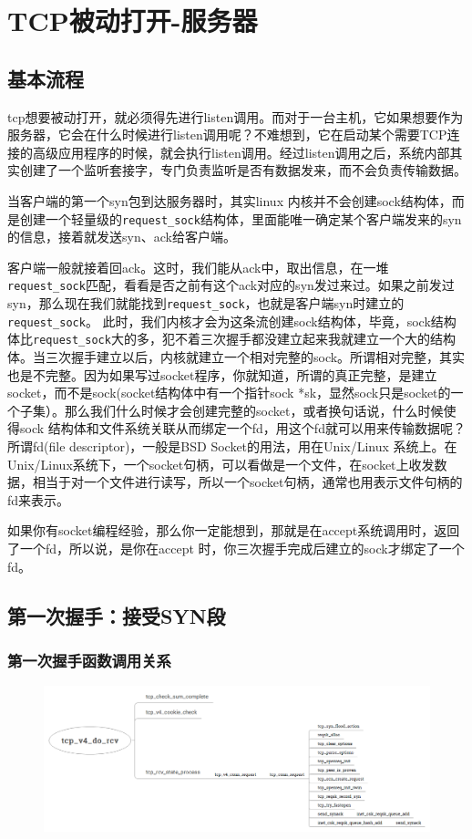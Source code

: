 \section{TCP被动打开-服务器}
        \subsection{基本流程}
            tcp想要被动打开，就必须得先进行listen调用。而对于一台主机，它如果想要作为服务器，它会在什么时候进行listen调用呢？不难想到，它在启动某个需要TCP连接的高级应用程序的时候，就会执行listen调用。经过listen调用之后，系统内部其实创建了一个监听套接字，专门负责监听是否有数据发来，而不会负责传输数据。

            当客户端的第一个syn包到达服务器时，其实linux 内核并不会创建sock结构体，而是创建一个轻量级的\texttt{request_sock}结构体，里面能唯一确定某个客户端发来的syn的信息，接着就发送syn、ack给客户端。

            客户端一般就接着回ack。这时，我们能从ack中，取出信息，在一堆\texttt{request_sock}匹配，看看是否之前有这个ack对应的syn发过来过。如果之前发过syn，那么现在我们就能找到\texttt{request_sock}，也就是客户端syn时建立的\texttt{request_sock}。 此时，我们内核才会为这条流创建sock结构体，毕竟，sock结构体比\texttt{request_sock}大的多，犯不着三次握手都没建立起来我就建立一个大的结构体。当三次握手建立以后，内核就建立一个相对完整的sock。所谓相对完整，其实也是不完整。因为如果写过socket程序，你就知道，所谓的真正完整，是建立socket，而不是sock(socket结构体中有一个指针sock *sk，显然sock只是socket的一个子集）。那么我们什么时候才会创建完整的socket，或者换句话说，什么时候使得sock 结构体和文件系统关联从而绑定一个fd，用这个fd就可以用来传输数据呢？所谓fd(file descriptor)，一般是BSD Socket的用法，用在Unix/Linux 系统上。在Unix/Linux系统下，一个socket句柄，可以看做是一个文件，在socket上收发数据，相当于对一个文件进行读写，所以一个socket句柄，通常也用表示文件句柄的fd来表示。

            如果你有socket编程经验，那么你一定能想到，那就是在accept系统调用时，返回了一个fd，所以说，是你在accept 时，你三次握手完成后建立的sock才绑定了一个 fd。
        \subsection{第一次握手：接受SYN段}
            \subsubsection{第一次握手函数调用关系}
                \begin{figure}[htb]        
                    \centering
                    \includegraphics[width=\textwidth]  {images/The First Shake Hand of Server.png}
                \end{figure}       

